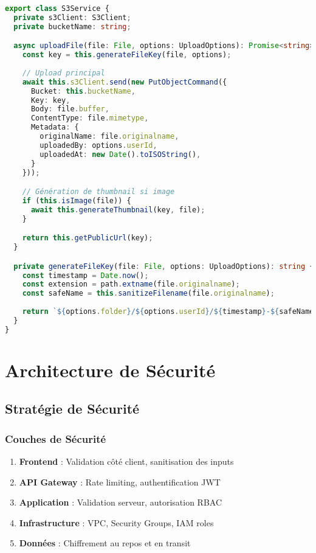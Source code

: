 \begin{lstlisting}[language=TypeScript, caption=Service S3]
export class S3Service {
  private s3Client: S3Client;
  private bucketName: string;

  async uploadFile(file: File, options: UploadOptions): Promise<string> {
    const key = this.generateFileKey(file, options);
    
    // Upload principal
    await this.s3Client.send(new PutObjectCommand({
      Bucket: this.bucketName,
      Key: key,
      Body: file.buffer,
      ContentType: file.mimetype,
      Metadata: {
        originalName: file.originalname,
        uploadedBy: options.userId,
        uploadedAt: new Date().toISOString(),
      }
    }));

    // Génération de thumbnail si image
    if (this.isImage(file)) {
      await this.generateThumbnail(key, file);
    }

    return this.getPublicUrl(key);
  }

  private generateFileKey(file: File, options: UploadOptions): string {
    const timestamp = Date.now();
    const extension = path.extname(file.originalname);
    const safeName = this.sanitizeFilename(file.originalname);
    
    return `${options.folder}/${options.userId}/${timestamp}-${safeName}${extension}`;
  }
}
\end{lstlisting}

\section{Architecture de Sécurité}

\subsection{Stratégie de Sécurité}

\subsubsection{Couches de Sécurité}

\begin{enumerate}
    \item \textbf{Frontend} : Validation côté client, sanitisation des inputs
    \item \textbf{API Gateway} : Rate limiting, authentification JWT
    \item \textbf{Application} : Validation serveur, autorisation RBAC
    \item \textbf{Infrastructure} : VPC, Security Groups, IAM roles
    \item \textbf{Données} : Chiffrement au repos et en transit
\end{enumerate}

